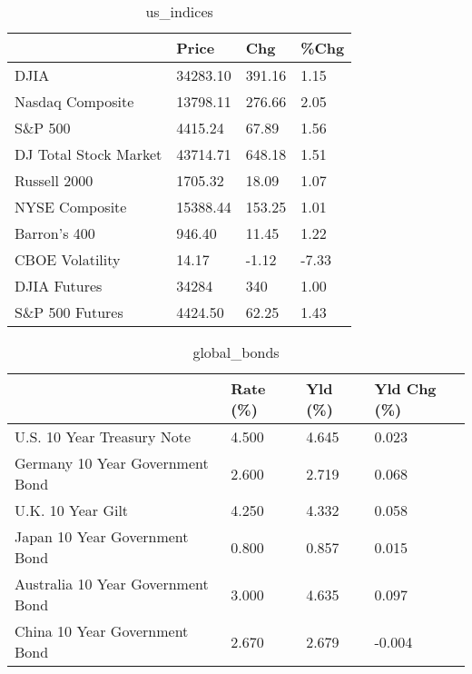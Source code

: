 \documentclass{article}%
\begin{document}
%


\begin{table}[htbp]%
\caption{us\_indices}%
\centering%
\begin{adjustbox}{width=1\textwidth}%
\begin{tabular}{llll}
\toprule
                      &    Price &    Chg &  \%Chg \\
\midrule
                 DJIA & 34283.10 & 391.16 &  1.15 \\
     Nasdaq Composite & 13798.11 & 276.66 &  2.05 \\
              S\&P 500 &  4415.24 &  67.89 &  1.56 \\
DJ Total Stock Market & 43714.71 & 648.18 &  1.51 \\
         Russell 2000 &  1705.32 &  18.09 &  1.07 \\
       NYSE Composite & 15388.44 & 153.25 &  1.01 \\
         Barron's 400 &   946.40 &  11.45 &  1.22 \\
      CBOE Volatility &    14.17 &  -1.12 & -7.33 \\
         DJIA Futures &    34284 &    340 &  1.00 \\
      S\&P 500 Futures &  4424.50 &  62.25 &  1.43 \\
\bottomrule
\end{tabular}
%
\end{adjustbox}%
\end{table}

%


\begin{table}[htbp]%
\caption{global\_bonds}%
\centering%
\begin{adjustbox}{width=1\textwidth}%
\begin{tabular}{llll}
\toprule
                                  & Rate (\%) & Yld (\%) & Yld Chg (\%) \\
\midrule
       U.S. 10 Year Treasury Note &    4.500 &   4.645 &       0.023 \\
  Germany 10 Year Government Bond &    2.600 &   2.719 &       0.068 \\
                U.K. 10 Year Gilt &    4.250 &   4.332 &       0.058 \\
    Japan 10 Year Government Bond &    0.800 &   0.857 &       0.015 \\
Australia 10 Year Government Bond &    3.000 &   4.635 &       0.097 \\
    China 10 Year Government Bond &    2.670 &   2.679 &      -0.004 \\
\bottomrule
\end{tabular}
%
\end{adjustbox}%
\end{table}
\end{document}
